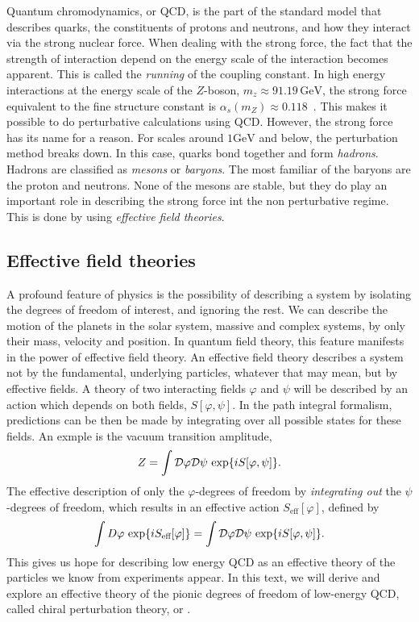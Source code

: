 Quantum chromodynamics, or QCD, is the part of the standard model that describes quarks, the constituents of protons and neutrons, and how they interact via the strong nuclear force.
When dealing with the strong force, the fact that the strength of interaction depend on the energy scale of the interaction becomes apparent.
This is called the \emph{running} of the coupling constant.
In high energy interactions at the energy scale of the $Z$-boson, $m_z \approx 91.19 \, \text{GeV}$, the strong force equivalent to the fine structure constant is $\alpha_s(m_Z) \approx 0.118$~\cite{PDG}. 
This makes it possible to do perturbative calculations using QCD.
However, the strong force has its name for a reason.
For scales around $1 \text{GeV}$ and below, the perturbation method breaks down.
In this case, quarks bond together and form \emph{hadrons}.
Hadrons are classified as \emph{mesons} or \emph{baryons}.
The most familiar of the baryons are the proton and neutrons.
None of the mesons are stable, but they do play an important role in describing the strong force int the non perturbative regime.
This is done by using \emph{effective field theories}.

\subsection*{Effective field theories}

A profound feature of physics is the possibility of describing a system by isolating the degrees of freedom of interest, and ignoring the rest.
We can describe the motion of the planets in the solar system, massive and complex systems, by only their mass, velocity and position.
In quantum field theory, this feature manifests in the power of effective field theory.
An effective field theory describes a system not by the fundamental, underlying particles, whatever that may mean, but by effective fields.
A theory of two interacting fields $\varphi$ and $\psi$ will be described by an action which depends on both fields, $S[\varphi, \psi]$.
In the path integral formalism, predictions can be then be made by integrating over all possible states for these fields.
An exmple is the vacuum transition amplitude,
\begin{equation}
    Z = \int \mathcal{D} \varphi \mathcal{D} \psi \, \exp{i S[\varphi, \psi]}.
\end{equation}
The effective description of only the $\varphi$-degrees of freedom by \emph{integrating out} the $\psi$-degrees of freedom, which results in an effective action $S_\text{eff}[\varphi]$, defined by~\cite{Schwartz:QFT}
\begin{equation}
    \label{integrating out degrees of freedom}
    \int D \varphi \, \exp{i S_\text{eff}[\varphi]} 
    =
    \int \mathcal{D} \varphi \mathcal{D} \psi \, \exp{i S[\varphi, \psi]}.
\end{equation}
This gives us hope for describing low energy QCD as an effective theory of the particles we know from experiments appear.
In this text, we will derive and explore an effective theory of the pionic degrees of freedom of low-energy QCD, called chiral perturbation theory, or \chpt.

